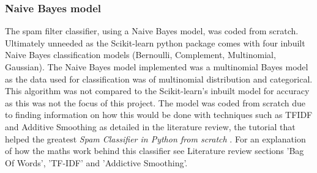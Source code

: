 \documentclass[oneside, 12pt]{article}
\begin{document}
		\subsubsection{Naive Bayes model}
		
		The spam filter classifier, using a Naive Bayes model, was coded from scratch. Ultimately unneeded as the Scikit-learn python package comes with four inbuilt Naive Bayes classification models (Bernoulli, Complement, Multinomial, Gaussian)\cite{41}. The Naive Bayes model implemented was a multinomial Bayes model as the data used for classification was of multinomial distribution and categorical. This algorithm was not compared to the Scikit-learn's inbuilt model for accuracy as this was not the focus of this project. The model was coded from scratch due to finding information on how this would be done with techniques such as TFIDF and Additive Smoothing as detailed in the literature review, the tutorial that helped the greatest \textit{Spam Classifier in Python from scratch} \cite{34} \cite{42}. For an explanation of how the maths work behind this classifier see Literature review sections 'Bag Of Words', 'TF-IDF' and 'Addictive Smoothing'.
		
\end{document}
